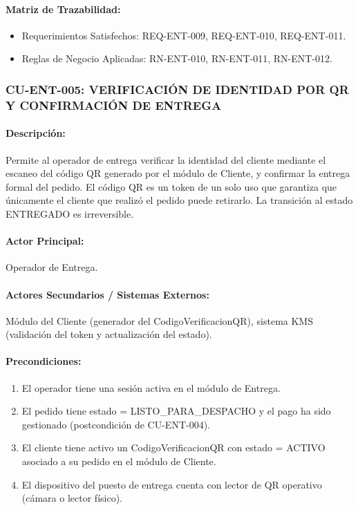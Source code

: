 \paragraph{Matriz de Trazabilidad:}
\begin{itemize}
    \item Requerimientos Satisfechos: REQ-ENT-009, REQ-ENT-010, REQ-ENT-011.
    \item Reglas de Negocio Aplicadas: RN-ENT-010, RN-ENT-011, RN-ENT-012.
\end{itemize}

\subsubsection{CU-ENT-005: VERIFICACIÓN DE IDENTIDAD POR QR Y CONFIRMACIÓN DE ENTREGA}
\paragraph{Descripción:} Permite al operador de entrega verificar la identidad del cliente mediante el escaneo del código QR generado por el módulo de Cliente, y confirmar la entrega formal del pedido. El código QR es un token de un solo uso que garantiza que únicamente el cliente que realizó el pedido puede retirarlo. La transición al estado ENTREGADO es irreversible.

\paragraph{Actor Principal:} Operador de Entrega.

\paragraph{Actores Secundarios / Sistemas Externos:} Módulo del Cliente (generador del CodigoVerificacionQR), sistema KMS (validación del token y actualización del estado).

\paragraph{Precondiciones:}
\begin{enumerate}
    \item[I.] El operador tiene una sesión activa en el módulo de Entrega.
    \item[II.] El pedido tiene estado = LISTO\_PARA\_DESPACHO y el pago ha sido gestionado (postcondición de CU-ENT-004).
    \item[III.] El cliente tiene activo un CodigoVerificacionQR con estado = ACTIVO asociado a su pedido en el módulo de Cliente.
    \item[IV.] El dispositivo del puesto de entrega cuenta con lector de QR operativo (cámara o lector físico).
\end{enumerate}

